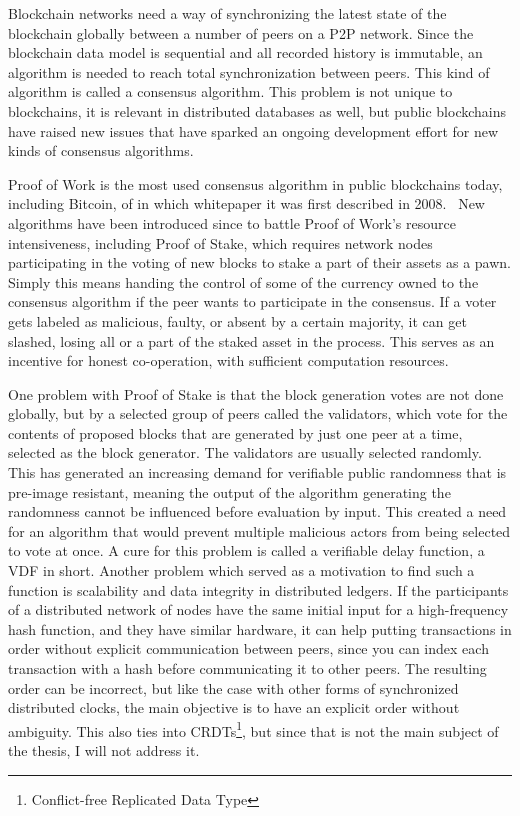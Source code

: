 Blockchain networks need a way of synchronizing the latest state of the blockchain globally between a number of peers on a P2P network. Since the blockchain data model is sequential and all recorded history is immutable, an algorithm is needed to reach total synchronization between peers. This kind of algorithm is called a consensus algorithm. This problem is not unique to blockchains, it is relevant in distributed databases as well, but public blockchains have raised new issues that have sparked an ongoing development effort for new kinds of consensus algorithms.

Proof of Work is the most used consensus algorithm in public blockchains today, including Bitcoin, of in which whitepaper it was first described in 2008.~\cite{Nakamoto2019-ax} New algorithms have been introduced since to battle Proof of Work's resource intensiveness, including Proof of Stake, which requires network nodes participating in the voting of new blocks to stake a part of their assets as a pawn. Simply this means handing the control of some of the currency owned to the consensus algorithm if the peer wants to participate in the consensus. If a voter gets labeled as malicious, faulty, or absent by a certain majority, it can get slashed, losing all or a part of the staked asset in the process. This serves as an incentive for honest co-operation, with sufficient computation resources.

One problem with Proof of Stake is that the block generation votes are not done globally, but by a selected group of peers called the validators, which vote for the contents of proposed blocks that are generated by just one peer at a time, selected as the block generator. The validators are usually selected randomly. This has generated an increasing demand for verifiable public randomness that is pre-image resistant, meaning the output of the algorithm generating the randomness cannot be influenced before evaluation by input. This created a need for an algorithm that would prevent multiple malicious actors from being selected to vote at once. A cure for this problem is called a verifiable delay function, a VDF in short. Another problem which served as a motivation to find such a function is scalability and data integrity in distributed ledgers. If the participants of a distributed network of nodes have the same initial input for a high-frequency hash function, and they have similar hardware, it can help putting transactions in order without explicit communication between peers, since you can index each transaction with a hash before communicating it to other peers. The resulting order can be incorrect, but like the case with other forms of synchronized distributed clocks, the main objective is to have an explicit order without ambiguity. This also ties into CRDTs\footnote{Conflict-free Replicated Data Type}, but since that is not the main subject of the thesis, I will not address it.

